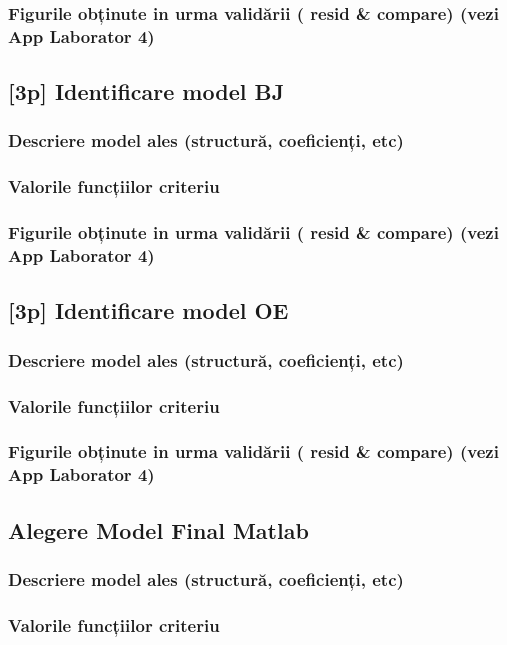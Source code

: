\documentclass[12pt,english]{article}
\begin{document}
\subsubsection { Figurile obținute in urma validării ( resid \& compare) (vezi App Laborator 4) }
\subsection { [3p] Identificare model BJ }
\subsubsection { Descriere model ales (structură, coeficienți, etc) }
\subsubsection { Valorile funcțiilor criteriu }
\subsubsection { Figurile obținute in urma validării ( resid \& compare) (vezi App Laborator 4) }
\subsection { [3p] Identificare model OE }
\subsubsection { Descriere model ales (structură, coeficienți, etc) }
\subsubsection { Valorile funcțiilor criteriu }
\subsubsection { Figurile obținute in urma validării ( resid \& compare) (vezi App Laborator 4) }
\subsection { Alegere Model Final Matlab }
\subsubsection { Descriere model ales (structură, coeficienți, etc) }
\subsubsection { Valorile funcțiilor criteriu }
\end{document}
